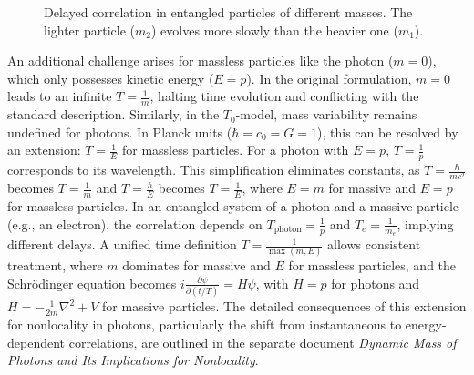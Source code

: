 \documentclass[a4paper,12pt]{article}
\begin{document}
	\begin{figure}[h]
		\centering
		\caption{Delayed correlation in entangled particles of different masses. The lighter particle ($m_2$) evolves more slowly than the heavier one ($m_1$).}
	\end{figure}
	
	An additional challenge arises for massless particles like the photon (\( m = 0 \)), which only possesses kinetic energy (\( E = p \)). In the original formulation, \( m = 0 \) leads to an infinite \( T = \frac{1}{m} \), halting time evolution and conflicting with the standard description. Similarly, in the \( T_0 \)-model, mass variability remains undefined for photons. In Planck units (\( \hbar = c_0 = G = 1 \)), this can be resolved by an extension: \( T = \frac{1}{E} \) for massless particles. For a photon with \( E = p \), \( T = \frac{1}{p} \) corresponds to its wavelength. This simplification eliminates constants, as \( T = \frac{\hbar}{m c^2} \) becomes \( T = \frac{1}{m} \) and \( T = \frac{\hbar}{E} \) becomes \( T = \frac{1}{E} \), where \( E = m \) for massive and \( E = p \) for massless particles. In an entangled system of a photon and a massive particle (e.g., an electron), the correlation depends on \( T_\text{photon} = \frac{1}{p} \) and \( T_e = \frac{1}{m_e} \), implying different delays. A unified time definition \( T = \frac{1}{\max(m, E)} \) allows consistent treatment, where \( m \) dominates for massive and \( E \) for massless particles, and the Schrödinger equation becomes \( i \frac{\partial \psi}{\partial (t/T)} = H \psi \), with \( H = p \) for photons and \( H = -\frac{1}{2m} \nabla^2 + V \) for massive particles. The detailed consequences of this extension for nonlocality in photons, particularly the shift from instantaneous to energy-dependent correlations, are outlined in the separate document \textit{Dynamic Mass of Photons and Its Implications for Nonlocality}.
	
\end{document}
